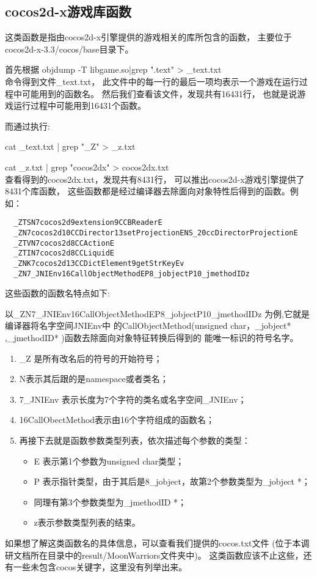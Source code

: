\subsection{cocos2d-x游戏库函数}
\label{sec:so:cocolib}
这类函数是指由cocos2d-x引擎提供的游戏相关的库所包含的函数，
主要位于cocos2d-x-3.3/cocos/base目录下。

首先根据
objdump -T libgame.so|grep ".text" > \_text.txt \\
命令得到文件\_text.txt，
此文件中的每一行的最后一项均表示一个游戏在运行过程中可能用到的函数名。
然后我们查看该文件，发现共有16431行，
也就是说游戏运行过程中可能用到16431个函数。

而通过执行:

cat \_text.txt | grep  "\_Z" > \_z.txt

cat \_z.txt | grep "cocos2dx" > cocos2dx.txt\\
查看得到的cocos2dx.txt，发现共有8431行，
可以推出cocos2d-x游戏引擎提供了8431个库函数，
这些函数都是经过编译器去除面向对象特性后得到的函数。例如：
 
\begin{lstlisting}
  _ZTSN7cocos2d9extension9CCBReaderE
  _ZN7cocos2d10CCDirector13setProjectionENS_20ccDirectorProjectionE
  _ZTVN7cocos2d8CCActionE
  _ZTIN7cocos2d8CCLiquidE
  _ZNK7cocos2d13CCDictElement9getStrKeyEv
  _ZN7_JNIEnv16CallObjectMethodEP8_jobjectP10_jmethodIDz
\end{lstlisting}

这些函数的函数名特点如下:
	
以\_ZN7\_JNIEnv16CallObjectMethodEP8\_jobjectP10\_jmethodIDz 为例,它就是编译器将名字空间JNIEnv中
的CallObjectMethod(unsigned char，\_jobject* ,\_jmethodID* )函数去除面向对象特征转换后得到的
能唯一标识的符号名字。
\begin{enumerate}
\item \_Z 是所有改名后的符号的开始符号；
\item N表示其后跟的是namespace或者类名；
\item 7\_JNIEnv 表示长度为7个字符的类名或名字空间\_JNIEnv；
\item 16CallObectMethod表示由16个字符组成的函数名；
\item 再接下去就是函数参数类型列表，依次描述每个参数的类型：
\begin{itemize}
\item E 表示第1个参数为unsigned char类型；
\item P 表示指针类型，由于其后是8\_jobject，故第2个参数类型为\_jobject *；
\item 同理有第3个参数类型为\_jmethodID *；
\item z表示参数类型列表的结束。
\end{itemize}
\end{enumerate}	
如果想了解这类函数名的具体信息，可以查看我们提供的cocos.txt文件
(位于本调研文档所在目录中的result/MoonWarriors文件夹中)。
这类函数应该不止这些，还有一些未包含cocos关键字，这里没有列举出来。


